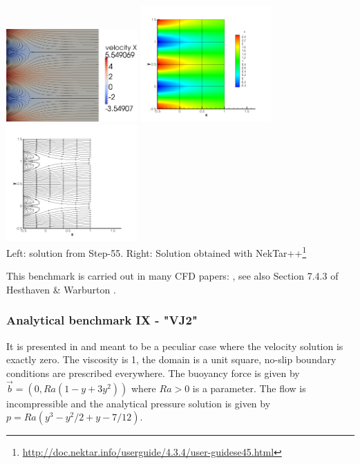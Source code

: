 \begin{center}
\includegraphics[width=5cm]{images/mms/kovasznay/step-55_solution}
\includegraphics[width=5cm]{images/mms/kovasznay/KF2DCVP8}
\includegraphics[width=5cm]{images/mms/kovasznay/KF2DCVP8SL}\\
{\captionfont 
Left: solution from Step-55. Right:
Solution obtained with 
NekTar++\footnote{\url{http://doc.nektar.info/userguide/4.3.4/user-guidese45.html}}}
\end{center}


This benchmark is carried out in many CFD papers: \cite{coks04b,bodi11,ngpe12}, see also Section 7.4.3
of Hesthaven \& Warburton \cite{hewa08}.


\bscthesis {}

\subsubsection{Analytical benchmark IX \label{mms9} - "VJ2"}

It is presented in \cite{jolm17} and meant to be a peculiar case where the velocity solution 
is exactly zero. The viscosity is 1, the domain is a unit square, no-slip boundary conditions 
are prescribed everywhere. The buoyancy force is given by $\vec{b}=(0,Ra(1-y+3y^2))$ where 
$Ra>0$ is a parameter. The flow is incompressible and the analytical pressure solution 
is given by $p=Ra(y^3-y^2/2+y-7/12)$.

